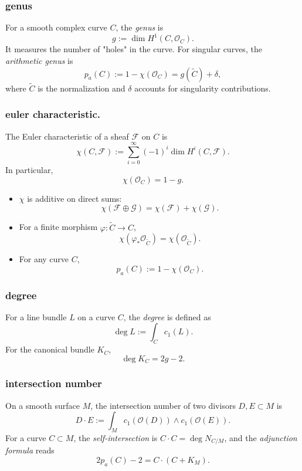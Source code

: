 \subsubsection{genus}
For a smooth complex curve \( C \), the \emph{genus} is
\[
g := \dim H^1(C, \mathcal{O}_C).
\]
It measures the number of "holes" in the curve. For singular curves, the \emph{arithmetic genus} is
\[
p_a(C) := 1 - \chi(\mathcal{O}_C) = g(\widetilde{C}) + \delta,
\]
where \( \widetilde{C} \) is the normalization and \( \delta \) accounts for singularity contributions.

\subsubsection{euler characteristic.}
The Euler characteristic of a sheaf \( \mathcal{F} \) on \( C \) is
\[
\chi(C, \mathcal{F}) := \sum_{i=0}^\infty (-1)^i \dim H^i(C, \mathcal{F}).
\]
In particular,
\[
\chi(\mathcal{O}_C) = 1 - g.
\]
\begin{itemize}
  \item \(\chi\) is additive on direct sums:
  \[
  \chi(\mathcal{F} \oplus \mathcal{G}) = \chi(\mathcal{F}) + \chi(\mathcal{G}).
  \]
  \item For a finite morphism \( \varphi: \widetilde{C} \to C \),
  \[
  \chi(\varphi_*\mathcal{O}_{\widetilde{C}}) = \chi(\mathcal{O}_{\widetilde{C}}).
  \]
  \item For any curve \( C \),
  \[
  p_a(C) := 1 - \chi(\mathcal{O}_C).
  \]
\end{itemize}

\subsubsection{degree}
For a line bundle \( L \) on a curve \( C \), the \emph{degree} is defined as
\[
\deg L := \int_C c_1(L).
\]
For the canonical bundle \( K_C \),
\[
\deg K_C = 2g - 2.
\]

\subsubsection{intersection number}
On a smooth surface \( M \), the intersection number of two divisors \( D, E \subset M \) is
\[
D \cdot E := \int_M c_1(\mathcal{O}(D)) \wedge c_1(\mathcal{O}(E)).
\]
For a curve \( C \subset M \), the \emph{self-intersection} is \( C \cdot C = \deg N_{C/M} \), and the \emph{adjunction formula} reads
\[
2p_a(C) - 2 = C \cdot (C + K_M).
\]

